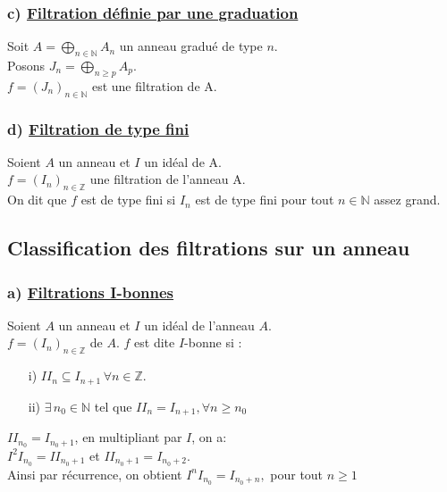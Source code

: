 \subsubsection{c) \underline{Filtration définie par une graduation}}
\begin{madefinition}
	Soit $A = \displaystyle \bigoplus_{n \in \mathbb{N}}{A_n}$ un anneau gradué de type $n$.\\ Posons $J_n = \displaystyle \bigoplus_{n \geqslant p }{A_p}$.\\
	$f=(J_n)_{n \in \mathbb{N}}$ est une filtration de A. 
\end{madefinition}
\subsubsection{d) \underline{Filtration de type fini}}
\begin{madefinition}
	Soient $A$ un anneau et $I$ un idéal de A.\\
	$f = (I_n)_{n\in \mathbb{Z}}$ une filtration de l'anneau A.\\
	On dit que $f$ est de type fini si $I_n$ est de type fini pour tout $n \in \mathbb{N}$ assez grand.
\end{madefinition}

\subsection{Classification des filtrations sur un anneau}
\subsubsection{a) \underline{Filtrations I-bonnes}} 
\begin{madefinition}
	Soient $A$ un anneau et $I$ un idéal de l'anneau $A$.\\
	$f = (I_n)_{n \in \mathbb{Z}}$ de $A$. $f$ est dite $I$-bonne si : \\
	\begin{enumerate}
		\item[i)]$ II_n \subseteq I_{n+1} \, \forall n \in \mathbb{Z}$.\\
		\item[ii)]$\exists \, n_0 \in \mathbb{N}$ tel que $II_n = I_{n+1}, \forall n \geqslant n_0$
	\end{enumerate}
\end{madefinition}
\begin{maconsequence}
	$II_{n_0} = I_{n_{0}+1}$, en multipliant par $I$, on a:\\ $I^{2}I_{n_0} = II_{n_{0}+1}$ et $II_{n_0+1} = I_{n_{0}+2}$. \\
	Ainsi par récurrence, on obtient $I^{n}I_{n_0} = I_{n_{0}+n},$ pour tout $n \geqslant 1$ 
\end{maconsequence}
